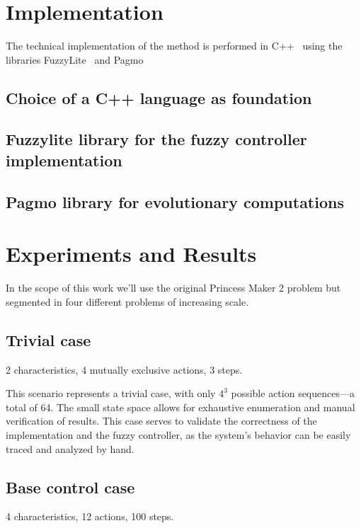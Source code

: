 \documentclass[11pt, a4paper]{article}
\begin{document}
	\section{Implementation}
	
	The technical implementation of the method is performed in C++~\cite{ppp3} using the libraries FuzzyLite~\cite{fl::fuzzylite} and Pagmo~\cite{Biscani2020}

	\subsection{Choice of a C++ language as foundation}
	
	\subsection{Fuzzylite library for the fuzzy controller implementation}
	
	\subsection{Pagmo library for evolutionary computations}
	
	\section{Experiments and Results}

	In the scope of this work we'll use the original Princess Maker 2 problem but segmented in four different problems of increasing scale.
	
	\subsection{Trivial case}

	2 characteristics, 4 mutually exclusive actions, 3 steps.

	This scenario represents a trivial case, with only $4^{3}$ possible action sequences—a total of 64.
	The small state space allows for exhaustive enumeration and manual verification of results.
	This case serves to validate the correctness of the implementation and the fuzzy controller, as the system's behavior can be easily traced and analyzed by hand.

	\subsection{Base control case}
    
	4 characteristics, 12 actions, 100 steps.
\end{document}
